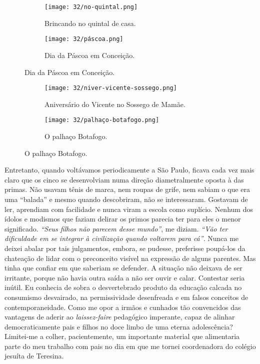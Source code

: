 \begin{figure}\ContinuedFloat
\hfill
\centering
\begin{subfigure}[h]{0.48\linewidth}
\centering
\texttt{[image: 32/no-quintal.png]}
\caption{Brincando no quintal de casa.}
\end{subfigure}
\hfill
\begin{subfigure}[h]{0.48\linewidth}
\centering
\texttt{[image: 32/páscoa.png]}
\caption{Dia da Páscoa em Conceição.}
\end{subfigure}
\end{figure}

\begin{figure}\ContinuedFloat
\hfill
\centering
\begin{subfigure}[h]{0.48\linewidth}
\centering
\texttt{[image: 32/niver-vicente-sossego.png]}
\caption{Aniversário do Vicente no Sossego de Mamãe.}
\end{subfigure}
\hfill
\begin{subfigure}[h]{0.48\linewidth}
\centering
\texttt{[image: 32/palhaço-botafogo.png]}
\caption{O palhaço Botafogo.}
\end{subfigure}
\end{figure}

Entretanto, quando voltávamos periodicamente a São Paulo, ficava cada vez mais claro que os cinco se desenvolviam numa direção diametralmente oposta à das primas.
Não usavam tênis de marca, nem roupas de grife, nem sabiam o que era uma ``balada'' e mesmo quando descobriram, não se interessaram.
Gostavam de ler, aprendiam com facilidade e nunca viram a escola como suplício.
Nenhum dos ídolos e modismos que faziam delirar os primos parecia ter para eles o menor significado.
\textit{``Seus filhos não parecem desse mundo''}, me diziam.
\textit{``Vão ter dificuldade em se integrar à civilização quando voltarem para cá''}.
Nunca me deixei abalar por tais julgamentos, embora, se pudesse, preferisse poupá-los da chateação de lidar com o preconceito visível na expressão de alguns parentes.
Mas tinha que confiar em que saberiam se defender.
A situação não deixava de ser irritante, porque não havia outra saída a não ser ouvir e calar.
Contestar seria inútil.
Eu conhecia de sobra o desvertebrado produto da educação calcada no consumismo desvairado, na permissividade desenfreada e em falsos conceitos de contemporaneidade.
Como me opor a irmãos e cunhados tão convencidos das vantagens de aderir ao \textit{laissez-faire} pedagógico imperante, capaz de alinhar democraticamente pais e filhos no doce limbo de uma eterna adolescência? Limitei-me a colher, pacientemente, um importante material que alimentaria parte do meu trabalho com pais no dia em que me tornei coordenadora do colégio jesuíta de Teresina.

